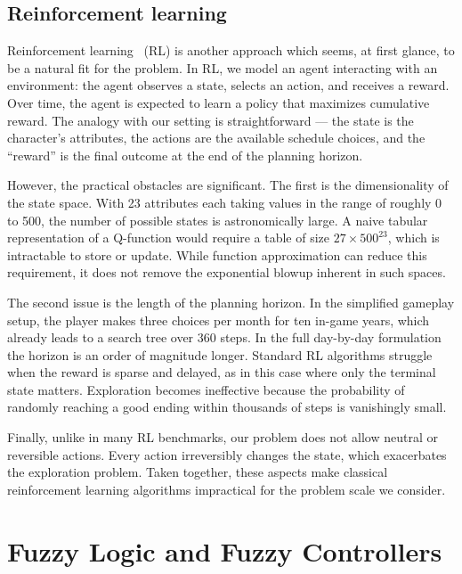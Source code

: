 \documentclass[12pt, a4paper]{report}
\begin{document}
	\subsection{Reinforcement learning}
	
	Reinforcement learning~\cite{sutton2018reinforcement} (RL) is another approach which seems, at first glance, to be a natural fit for the problem.
	In RL, we model an agent interacting with an environment: the agent observes a state, selects an action, and receives a reward.
	Over time, the agent is expected to learn a policy that maximizes cumulative reward.
	The analogy with our setting is straightforward — the state is the character’s attributes, the actions are the available schedule choices, and the “reward” is the final outcome at the end of the planning horizon.
	
	However, the practical obstacles are significant.
	The first is the dimensionality of the state space.
	With 23 attributes each taking values in the range of roughly 0 to 500, the number of possible states is astronomically large.
	A naive tabular representation of a Q-function would require a table of size $27 \times 500^{23}$, which is intractable to store or update.
	While function approximation can reduce this requirement, it does not remove the exponential blowup inherent in such spaces.
	
	The second issue is the length of the planning horizon.
	In the simplified gameplay setup, the player makes three choices per month for ten in-game years, which already leads to a search tree over 360 steps.
	In the full day-by-day formulation the horizon is an order of magnitude longer.
	Standard RL algorithms struggle when the reward is sparse and delayed, as in this case where only the terminal state matters.
	Exploration becomes ineffective because the probability of randomly reaching a good ending within thousands of steps is vanishingly small.
		
	Finally, unlike in many RL benchmarks, our problem does not allow neutral or reversible actions.
	Every action irreversibly changes the state, which exacerbates the exploration problem.
	Taken together, these aspects make classical reinforcement learning algorithms impractical for the problem scale we consider.

	\section{Fuzzy Logic and Fuzzy Controllers}
	
\end{document}
